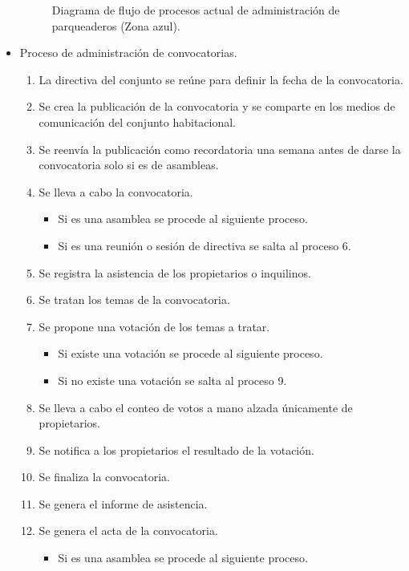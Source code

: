 \begin{itemize}
\begin{figure}[H]
        \caption{Diagrama de flujo de procesos actual de administración de parqueaderos (Zona azul).}
        \label{fig:flujo-proceso-actual-parqueadero-azul}
    \end{figure}
    \item Proceso de administración de convocatorias.
    \begin{enumerate}
        \item La directiva del conjunto se reúne para definir la fecha de la convocatoria.
        \item Se crea la publicación de la convocatoria y se comparte en los medios de comunicación del conjunto habitacional.
        \item Se reenvía la publicación como recordatoria una semana antes de darse la convocatoria solo si es de asambleas.
        \item Se lleva a cabo la convocatoria.
        \begin{itemize}
            \item Si es una asamblea se procede al siguiente proceso.
            \item Si es una reunión o sesión de directiva se salta al proceso 6.
        \end{itemize}
        \item Se registra la asistencia de los propietarios o inquilinos.
        \item Se tratan los temas de la convocatoria.
        \item Se propone una votación de los temas a tratar.
        \begin{itemize}
            \item Si existe una votación se procede al siguiente proceso.
            \item Si no existe una votación se salta al proceso 9.
        \end{itemize}
        \item Se lleva a cabo el conteo de votos a mano alzada únicamente de propietarios.
        \item Se notifica a los propietarios el resultado de la votación.
        \item Se finaliza la convocatoria.
        \item Se genera el informe de asistencia.
        \item Se genera el acta de la convocatoria.
        \begin{itemize}
            \item Si es una asamblea se procede al siguiente proceso.

\end{itemize}
\end{enumerate}
\end{itemize}
